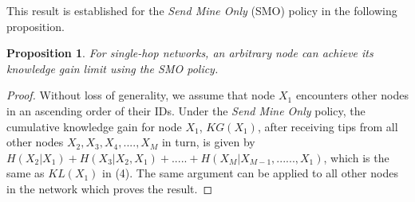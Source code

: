 \documentclass[12pt,epsf]{article}
\newtheorem{prop}{Proposition}
\theoremstyle{definition}
\begin{document}
This result is established for the {\it Send Mine Only} (SMO) policy in the following proposition.
%
%
\vspace{-0.2 cm}
\begin{prop}
For single-hop networks, an arbitrary node can achieve its knowledge gain limit using the {\it SMO} policy.
\end{prop}
%
\vspace{-0.5 cm}
\begin{proof}
Without loss of generality, we assume that node $X_1$ encounters other nodes in an ascending order of their IDs. Under the {\it Send Mine Only} policy, 
the cumulative knowledge gain for node $X_1$, $KG(X_1)$, after receiving tips from all other nodes $X_2, X_3, X_4,...., X_M$ in turn, is given by $H(X_2|X_1) + H(X_3|X_2,X_1) + .....+ H(X_M|X_{M-1}, ......, X_1)$, which is the same as $KL(X_1)$ in (4). 
The same argument can be applied to all other nodes in the network which proves the result.
%
%
\end{proof}
\end{document}
